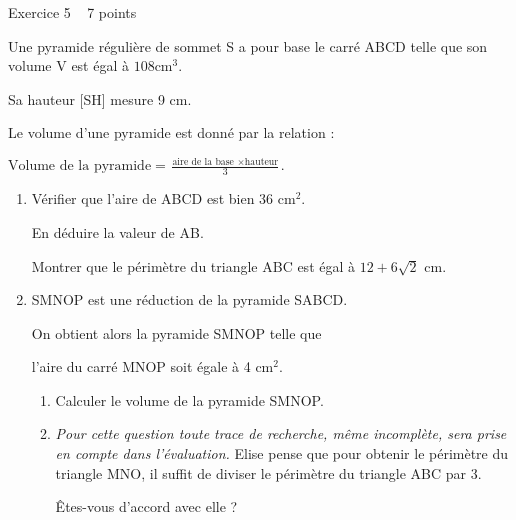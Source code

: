 
%
\begin{h2}Exercice 5   7 points\end{h2}
Une pyramide régulière de sommet S a pour base le carré ABCD telle que son volume V est égal à $108\text{cm}^{3}$.

\begin{center}
\end{center}

Sa hauteur [SH] mesure 9 cm.
\par
Le volume d'une pyramide est donné par la relation :
\par
$\text{Volume de la pyramide}=\frac{\text{aire de la base }\times  \text{hauteur}}{3}.$
\begin{enumerate}
     \item
     Vérifier que l'aire de ABCD est bien 36 cm$^{2}$.
     \par
     En déduire la valeur de AB.
     \par
     Montrer que le périmètre du triangle ABC est égal à $12+6\sqrt{2}$ cm.
     \item
     SMNOP est une réduction de la pyramide SABCD.
     \par
     On obtient alors la pyramide SMNOP telle que
     \par
     l'aire du carré MNOP soit égale à 4 cm$^{2}$.
     \begin{enumerate}[label=\alph*.]
          \item
          Calculer le volume de la pyramide SMNOP.
          \item
          \textit{Pour cette question toute trace de recherche, même incomplète, sera prise en compte dans l'évaluation.}
          Elise pense que pour obtenir le périmètre du triangle MNO, il suffit de diviser le périmètre du triangle ABC par 3.
          \par
     Êtes-vous d'accord avec elle ?
\end{enumerate}
\end{enumerate}

